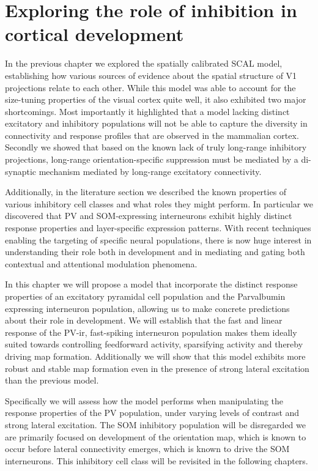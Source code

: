 \chapter{Exploring the role of inhibition in cortical development}

In the previous chapter we explored the spatially calibrated SCAL
model, establishing how various sources of evidence about the spatial
structure of V1 projections relate to each other. While this model was
able to account for the size-tuning properties of the visual cortex
quite well, it also exhibited two major shortcomings. Most importantly
it highlighted that a model lacking distinct excitatory and inhibitory
populations will not be able to capture the diversity in connectivity
and response profiles that are observed in the mammalian
cortex. Secondly we showed that based on the known lack of truly
long-range inhibitory projections, long-range orientation-specific
suppression must be mediated by a di-synaptic mechanism mediated by
long-range excitatory connectivity.

Additionally, in the literature section we described the known
properties of various inhibitory cell classes and what roles they
might perform. In particular we discovered that PV and SOM-expressing
interneurons exhibit highly distinct response properties and
layer-specific expression patterns. With recent techniques enabling
the targeting of specific neural populations, there is now huge
interest in understanding their role both in development and in
mediating and gating both contextual and attentional modulation
phenomena.

In this chapter we will propose a model that incorporate the distinct
response properties of an excitatory pyramidal cell population and the
Parvalbumin expressing interneuron population, allowing us to make
concrete predictions about their role in development. We will
establish that the fast and linear response of the PV-ir, fast-spiking
interneuron population makes them ideally suited towards controlling
feedforward activity, sparsifying activity and thereby driving map
formation. Additionally we will show that this model exhibits more
robust and stable map formation even in the presence of strong lateral
excitation than the previous model.

Specifically we will assess how the model performs when manipulating
the response properties of the PV population, under varying levels of
contrast and strong lateral excitation. The SOM inhibitory population
will be disregarded we are primarily focused on development of the
orientation map, which is known to occur before lateral connectivity
emerges, which is known to drive the SOM interneurons. This inhibitory
cell class will be revisited in the following chapters.

